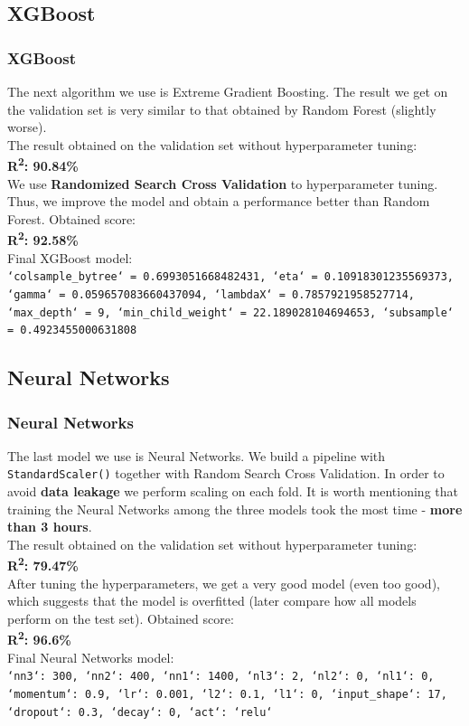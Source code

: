 \documentclass[8pt]{beamer}
\begin{document}
\subsection{XGBoost}
\begin{frame}
\frametitle{XGBoost}
The next algorithm we use is Extreme Gradient Boosting. The result we get on the validation set is very similar to that obtained by Random Forest (slightly worse).\\
The result obtained on the validation set without hyperparameter tuning:\\ \textbf{R\textsuperscript{2}: 90.84\%} \\
\vspace{2mm}
We use \textbf{Randomized Search Cross Validation} to hyperparameter tuning. Thus, we improve the model and obtain a performance better than Random Forest. Obtained score:\\ \textbf{R\textsuperscript{2}: 92.58\%}\\
\vspace{2mm}
Final XGBoost model:\\ \texttt{`colsample\_bytree` = 0.6993051668482431, `eta` = 0.10918301235569373, `gamma` = 0.059657083660437094, `lambdaX` = 0.7857921958527714, `max\_depth` = 9, `min\_child\_weight` = 22.189028104694653, `subsample` = 0.4923455000631808}
\end{frame}


\subsection{Neural Networks}
\begin{frame}
\frametitle{Neural Networks}
The last model we use is Neural Networks. We build a pipeline with \texttt{StandardScaler()} together with Random Search Cross Validation. In order to avoid \textbf{data leakage} we perform scaling on each fold. It is worth mentioning that training the Neural Networks among the three models took the most time - \textbf{more than 3 hours}.\\
The result obtained on the validation set without hyperparameter tuning:\\ \textbf{R\textsuperscript{2}: 79.47\%} \\
\vspace{2mm}
After tuning the hyperparameters, we get a very good model (even too good), which suggests that the model is overfitted (later compare how all models perform on the test set). Obtained score:\\ \textbf{R\textsuperscript{2}: 96.6\%}\\
\vspace{2mm}
Final Neural Networks model:\\ \texttt{`nn3`: 300, `nn2`: 400, `nn1`: 1400, `nl3`: 2, `nl2`: 0, `nl1`: 0, `momentum`: 0.9, `lr`: 0.001, `l2`: 0.1, `l1`: 0, `input\_shape`: 17, `dropout`: 0.3, `decay`: 0, `act`: `relu`}
\end{frame}
\end{document}
